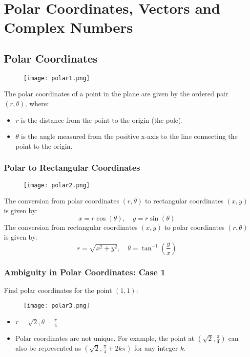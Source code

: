 \chapter{Polar Coordinates, Vectors and Complex Numbers}
\author{Nithin}

\section{Polar Coordinates}
\begin{figure}
    \centering
    \texttt{[image: polar1.png]}
\end{figure}
The polar coordinates of a point in the plane are given by the ordered pair \((r, \theta)\), where:
\begin{itemize}
    \item \(r\) is the distance from the point to the origin (the pole).
    \item \(\theta\) is the angle measured from the positive x-axis to the line connecting the point to the origin.
\end{itemize}

\subsection{Polar to Rectangular Coordinates}
\begin{figure}
    \centering
    \texttt{[image: polar2.png]}
\end{figure}
The conversion from polar coordinates \((r, \theta)\) to rectangular coordinates \((x, y)\) is given by:
\[ x = r \cos(\theta), \quad y = r \sin(\theta) \]
The conversion from rectangular coordinates \((x, y)\) to polar coordinates \((r, \theta)\) is given by:
\[ r = \sqrt{x^2 + y^2}, \quad \theta = \tan^{-1}\left(\frac{y}{x}\right) \]

\subsection{Ambiguity in Polar Coordinates: Case 1}
Find polar coordinates for the point \((1, 1)\):
\begin{figure}
    \centering
    \texttt{[image: polar3.png]}
\end{figure}
\begin{itemize}
    \item \(r = \sqrt{2}, \theta = \frac{\pi}{4}\)
    \item Polar coordinates are not unique. For example, the point at \( (\sqrt{2}, \frac{\pi}{4}) \) can also be represented as \( (\sqrt{2}, \frac{\pi}{4} + 2k\pi) \)  for any integer \( k \).
\end{itemize}

